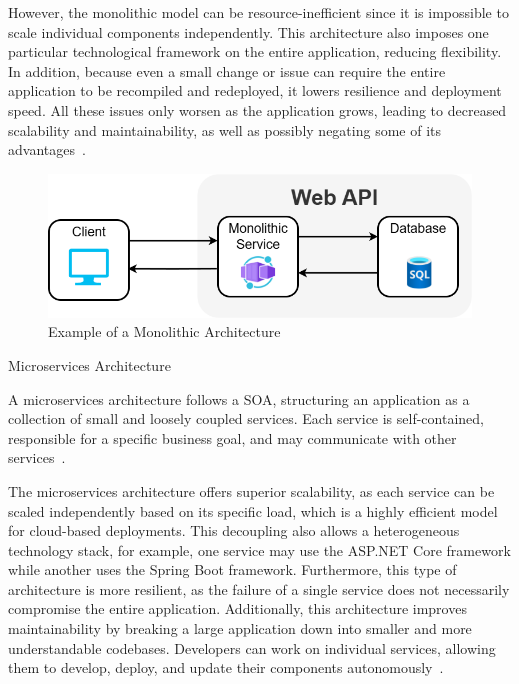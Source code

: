 \documentclass[12pt, reqno]{amsbook}
\makeatletter
\def\subsection{\@startsection{subsection}{2}%
      \z@{.5\linespacing\@plus.7\linespacing}{.25\linespacing}%
      {\normalfont\bfseries\flushleft}}
\theoremstyle{definition}
\theoremstyle{definition}
\numberwithin{section}{chapter}
\numberwithin{table}{chapter}
\numberwithin{figure}{chapter}
\makeatother
\begin{document}
However, the monolithic model can be resource-inefficient since it is impossible to scale individual components independently. This architecture also imposes one particular technological framework on the entire application, reducing flexibility. In addition, because even a small change or issue can require the entire application to be recompiled and redeployed, it lowers resilience and deployment speed. All these issues only worsen as the application grows, leading to decreased scalability and maintainability, as well as possibly negating some of its advantages~\cite{Taibi2018, Adrio2023, Moysiadis2022, Figueira2024, Kenan2020, Villamizar2015}.

\FloatBarrier
\begin{figure}[H]
  \includegraphics[width=0.9\linewidth]{images/MonolithicArchitecture.png}
  \caption{\label{Figure:Monolithic_Architecture}Example of a Monolithic Architecture}
\end{figure}
\FloatBarrier

\subsection{Microservices Architecture}
\label{Subsection:Microservices_Architecture}

A microservices architecture follows a \ac{SOA}, structuring an application as a collection of small and loosely coupled services. Each service is self-contained, responsible for a specific business goal, and may communicate with other services~\cite{Taibi2018, Adrio2023, Moysiadis2022, Khalfaoui2025, Figueira2024, Kenan2020}.

The microservices architecture offers superior scalability, as each service can be scaled independently based on its specific load, which is a highly efficient model for cloud-based deployments. This decoupling also allows a heterogeneous technology stack, for example, one service may use the ASP.NET Core framework while another uses the Spring Boot framework. Furthermore, this type of architecture is more resilient, as the failure of a single service does not necessarily compromise the entire application. Additionally, this architecture improves maintainability by breaking a large application down into smaller and more understandable codebases. Developers can work on individual services, allowing them to develop, deploy, and update their components autonomously~\cite{Taibi2018, Adrio2023, Moysiadis2022, Khalfaoui2025, Figueira2024, Kenan2020, Villamizar2015}.
\end{document}
